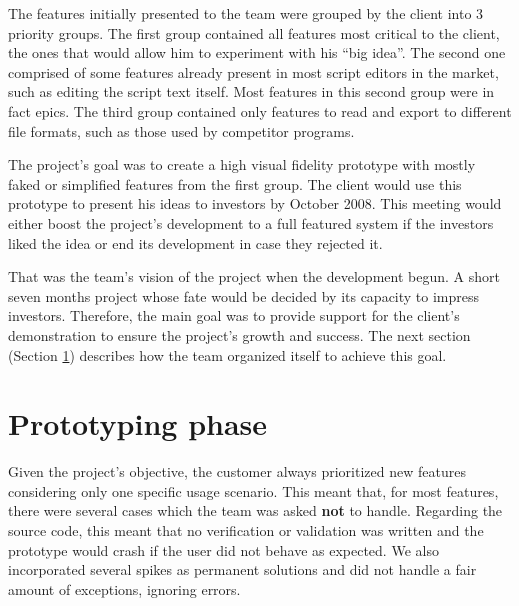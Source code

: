 \documentclass[lnbip]{svmultln}
\begin{document}

The features initially presented to the team were grouped by the client into 3
priority groups. The first group contained all features most critical to the
client, the ones that would allow him to experiment with his ``big idea''. The
second one comprised of some features already present in most script editors in
the market, such as editing the script text itself. Most features in this second
group were in fact epics. The third group contained only features to read and
export to different file formats, such as those used by competitor programs.

The project's goal was to create a high visual fidelity prototype with mostly
faked or simplified features from the first group. The client would use this
prototype to present his ideas to investors by October 2008. This meeting would
either boost the project's development to a full featured system if the
investors liked the idea or end its development in case they rejected it.

That was the team's vision of the project when the development begun. A short
seven months project whose fate would be decided by its capacity to impress
investors. Therefore, the main goal was to provide support for the client's
demonstration to ensure the project's growth and success. The next section
(Section \ref{sec:working}) describes how the team organized itself to achieve
this goal.

\section{Prototyping phase}
\label{sec:working}

Given the project's objective, the customer always prioritized new features
considering only one specific usage scenario. This meant that, for most
features, there were several cases which the team was asked \textbf{not} to
handle. Regarding the source code, this meant that no verification or validation
was written and the prototype would crash if the user did not behave as
expected. We also incorporated several spikes as permanent solutions and did not
handle a fair amount of exceptions, ignoring errors.
\end{document}
